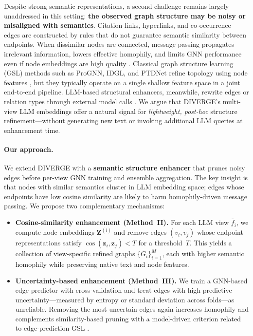 \documentclass{article}
\begin{document}
Despite strong semantic representations, a second challenge remains largely unaddressed
in this setting: \textbf{the observed graph structure may be noisy or misaligned with
semantics}. Citation links, hyperlinks, and co-occurrence edges are constructed by
rules that do not guarantee semantic similarity between endpoints. When dissimilar nodes
are connected, message passing propagates irrelevant information, lowers effective
homophily, and limits GNN performance even if node embeddings are high quality
\citep{zhu2021survey,chen2020idgl,dong2023gps}. Classical graph structure learning (GSL)
methods such as ProGNN, IDGL, and PTDNet refine topology using node features
\citep{jin2020prognn,chen2020idgl,luo2021ptdnet}, but they typically operate on a single
shallow feature space in a joint end-to-end pipeline. LLM-based structural enhancers,
meanwhile, rewrite edges or relation types through external model calls
\citep{Sun2026TopologicalEnhancerTAG,guo2024graphedit,zhang2025leveraging}. We argue
that DIVERGE's multi-view LLM embeddings offer a natural signal for \emph{lightweight,
post-hoc} structure refinement---without generating new text or invoking additional LLM
queries at enhancement time.

\paragraph{Our approach.}
We extend DIVERGE with a \textbf{semantic structure enhancer} that prunes noisy edges
before per-view GNN training and ensemble aggregation. The key insight is that nodes
with similar semantics cluster in LLM embedding space; edges whose endpoints have low
cosine similarity are likely to harm homophily-driven message passing. We propose two
complementary mechanisms:

\begin{itemize}
\item \textbf{Cosine-similarity enhancement (Method~II).} For each LLM view
$\bar{f}_i$, we compute node embeddings $\mathbf{Z}^{(i)}$ and remove edges
$(v_i,v_j)$ whose endpoint representations satisfy
$\cos(\mathbf{z}_i,\mathbf{z}_j) < T$ for a threshold~$T$. This yields a collection of
view-specific refined graphs $\{\bar{G}_i\}_{i=1}^{M}$, each with higher semantic
homophily while preserving native text and node features.

\item \textbf{Uncertainty-based enhancement (Method~III).} We train a GNN-based edge
predictor with cross-validation and treat edges with high predictive uncertainty---measured
by entropy or standard deviation across folds---as unreliable. Removing the most
uncertain edges again increases homophily and complements similarity-based pruning with
a model-driven criterion related to edge-prediction GSL
\citep{yu2020grcn,zhao2021gaug}.
\end{itemize}
\end{document}
